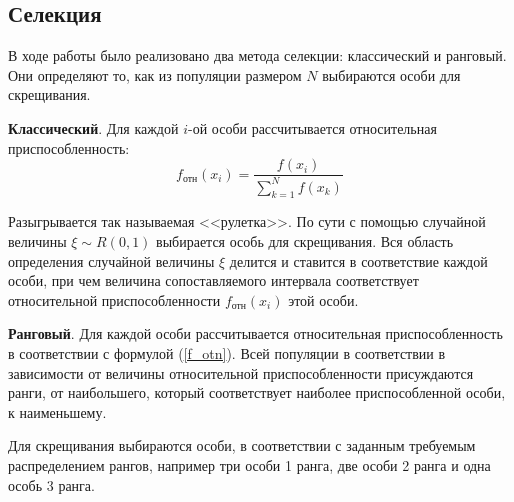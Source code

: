 	\subsection{Селекция}
	
	В ходе работы было реализовано два метода селекции: классический и ранговый. Они определяют то, как из популяции размером $N$ выбираются особи для скрещивания.
	
	\textbf{Классический}. Для каждой $i$-ой особи рассчитывается относительная приспособленность:
	\begin{equation}
		f_\text{отн}(x_i) = \frac{f(x_i)}{\sum_{k=1}^N f(x_k)}
		\label{f_otn}
	\end{equation}

	Разыгрывается так называемая <<рулетка>>. По сути с помощью случайной величины $\xi \sim R(0, 1)$ выбирается особь для скрещивания. Вся область определения случайной величины $\xi$ делится и ставится в соответствие каждой особи, при чем величина сопоставляемого интервала соответствует относительной приспособленности $f_\text{отн}(x_i)$ этой особи.
	
	\begin{center}
		\label{ruletka}
	\end{center}

	\textbf{Ранговый}. Для каждой особи рассчитывается относительная приспособленность в соответствии с формулой (\ref{f_otn}). Всей популяции в соответствии в зависимости от величины относительной приспособленности присуждаются ранги, от наибольшего, который соответствует наиболее приспособленной особи, к наименьшему.

	Для скрещивания выбираются особи, в соответствии с заданным требуемым распределением рангов, например три особи 1 ранга, две особи 2 ранга и одна особь 3 ранга.
	
